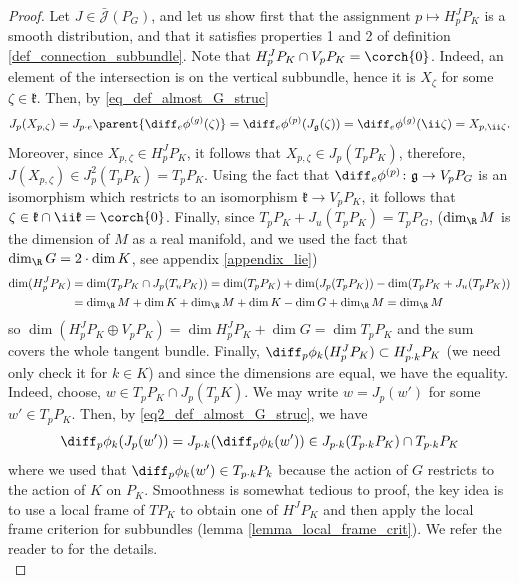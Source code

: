 \begin{proof}
    Let \(J \in \bar{\mathscr{J}}(P_G)\), and let us show first that the assignment \(p \mapsto H^J_pP_K\) is a smooth distribution, and that it satisfies properties 1 and 2 of definition \ref{def_connection_subbundle}. Note that \(H^J_pP_K \cap V_pP_K=\corch{0}\). Indeed, an element of the intersection is on the vertical subbundle, hence it is \(X_\zeta\) for some \(\zeta \in \mathfrak{k}\). Then, by \eqref{eq_def_almost_G_struc}
    \[
    J_p(X_{p,\zeta})= J_{p\cdot e}\parent{\diff_e\phi^{(g)}(\zeta)}=\diff_e\phi^{(p)}(J_\mathfrak{g}(\zeta)) =\diff_e\phi^{(g)}(\ii \zeta) =X_{p, \ii \zeta}.
    \]
    Moreover, since \(X_{p, \zeta} \in H^J_p P_K\), it follows that \(X_{p, \zeta}\in J_p(T_pP_K)\), therefore, \(J(X_{p, \zeta})\in J_p^2(T_pP_K)=T_pP_K\). Using the fact that \(\diff_e\phi^{(p)}\colon \mathfrak{g}\to V_pP_G\) is an isomorphism which restricts to an isomorphism \(\mathfrak{k}\to V_pP_K\), it follows that \(\zeta \in \mathfrak{k} \cap \ii \mathfrak{k}=\corch{0}\). Finally, since \(T_pP_K+J_u(T_pP_K)=T_pP_G\), (\(\dim_\R M\) is the dimension of \(M\) as a real manifold, and we used the fact that \(\dim_\R G=2\cdot \dim K\), see appendix \ref{appendix_lie}) 
    \begin{equation} \label{eq_dim_horiz}
        \begin{split}
        \dim (H^J_pP_K) &= \dim(T_pP_K \cap J_p(T_uP_K)) = \dim(T_pP_K) + \dim(J_p(T_pP_K))-\dim(T_pP_K+J_u(T_pP_K)) \\
        & =\dim_\R M + \dim K+ \dim_\R M+\dim K- \dim G +\dim_\R M =\dim _\R M 
        \end{split}
    \end{equation} 
    so \(\dim (H^J_pP_K \oplus V_pP_K)=\dim H^J_pP_K+\dim G=\dim T_pP_K\) and the sum covers the whole tangent bundle. Finally, \(\diff_p\phi_k(H^J_pP_K)\subset H^J_{p\cdot k}P_K\) (we need only check it for \(k \in K\)) and since the dimensions are equal, we have the equality. Indeed, choose, \(w\in T_pP_K \cap J_p(T_pK)\). We may write \(w=J_p(w')\) for some \(w'\in T_pP_K\). Then, by \eqref{eq2_def_almost_G_struc}, we have
    \[
    \diff_p\phi_k(J_p(w'))=J_{p\cdot k}(\diff_p\phi_k(w'))\in J_{p\cdot k}(T_{p\cdot k}P_K)\cap T_{p\cdot k}P_K
    \]
    where we used that \(\diff_p\phi_k(w')\in T_{p\cdot k}P_k\) because the action of \(G\) restricts to the action of \(K\) on \(P_K\).
    Smoothness is somewhat tedious to proof, the key idea is to use a local frame of \(TP_K\) to obtain one of \(H^JP_K\) and then apply the local frame criterion for subbundles (lemma \ref{lemma_local_frame_crit}). We refer the reader to \parencite[Th. 3.1.1]{Sandon_Chern_Correspondence} for the details. \\


\end{proof}
